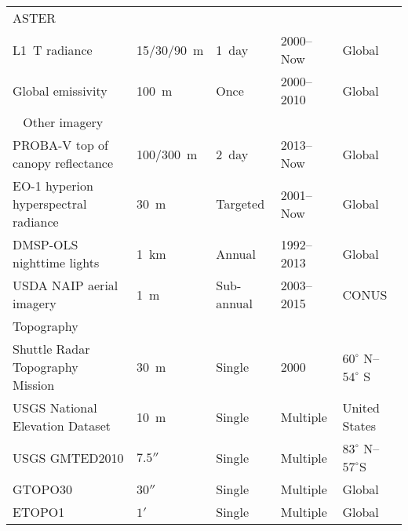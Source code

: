 \begin{table}[h]
\begin{tabularx}{\textwidth}{lXXXX}
		 ASTER	& & & & \\	
		 L1 T radiance	&15/30/90 m	&1 day&	2000–Now&	Global \\
		 Global emissivity	&100 m	&Once	&2000–2010&	Global \\
		  
		 Other imagery	& & & & \\		
		 PROBA-V top of canopy reflectance&	100/300 m&	2 day&	2013–Now&	Global\\
		 EO-1 hyperion hyperspectral radiance&	30 m&	Targeted&	2001–Now&	Global\\
		 DMSP-OLS nighttime lights&	1 km&	Annual&	1992–2013&	Global\\
		 USDA NAIP aerial imagery&	1 m	&Sub-annual	&2003–2015& 	CONUS\\
		 
		 Topography			& & & & \\		
		 Shuttle Radar Topography Mission&	30 m&	Single&	2000&	$60^\circ$ N–$54^\circ$ S\\
		 USGS National Elevation Dataset&	10 m&	Single&	Multiple&	United States\\
		 USGS GMTED2010&	$7.5''$&	Single	&Multiple&	$83^\circ$ N–$57^\circ$S\\
		 GTOPO30&	$30''$	&Single	&Multiple	&Global\\
		 ETOPO1	& $1'$ &	Single&	Multiple &	Global \\
		 

\end{tabularx}
\end{table}
